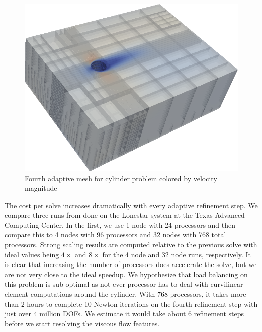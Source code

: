 \documentclass[Dissertation.tex]{subfiles}
\begin{document}
\begin{figure}[!ht]
\centering
\includegraphics[width=\textwidth]{Dissertation/Cylinder/Mesh_uMag4.png}
\caption{Fourth adaptive mesh for cylinder problem colored by velocity magnitude}
\label{fig:CylinderMesh4}
\end{figure}

The cost per solve increases dramatically with every adaptive refinement step.
We compare three runs from done on the Lonestar system at the Texas Advanced Computing Center.
In the first, we use 1 node with 24 processors and then compare this to 4 nodes with 96 processors and
32 nodes with 768 total processors.
Strong scaling results are computed relative to the previous solve 
with ideal values being $4\times$ and $8\times$ for the 4 node and 32 node runs, respectively.
It is clear that increasing the number of processors does accelerate the solve, but we are not
very close to the ideal speedup.
We hypothesize that load balancing on this problem is sub-optimal as not ever processor has
to deal with curvilinear element computations around the cylinder.
With 768 processors, it takes more than 2 hours to complete 10 Newton iterations 
on the fourth refinement step with just over 4 million DOFs.
We estimate it would take about 6 refinement steps before we start resolving the viscous flow features.
\end{document}
